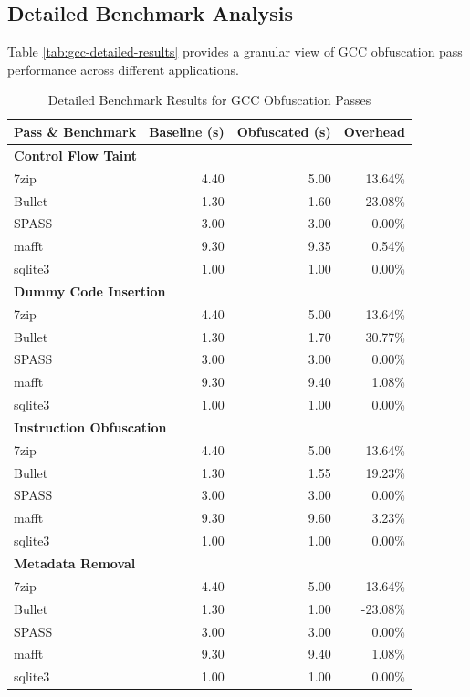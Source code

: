 \documentclass[conference]{IEEEtran}
\begin{document}
\subsection{Detailed Benchmark Analysis}

Table \ref{tab:gcc-detailed-results} provides a granular view of GCC obfuscation pass performance across different applications.

\begin{table}[ht!]
\centering
\footnotesize
\caption{Detailed Benchmark Results for GCC Obfuscation Passes}
\begin{tabular}{|l|r|r|r|}
\hline
\textbf{Pass \& Benchmark} & \textbf{Baseline (s)} & \textbf{Obfuscated (s)} & \textbf{Overhead} \\
\hline
\multicolumn{4}{|l|}{\textbf{Control Flow Taint}} \\
\hline
7zip & 4.40 & 5.00 & 13.64\% \\
Bullet & 1.30 & 1.60 & 23.08\% \\
SPASS & 3.00 & 3.00 & 0.00\% \\
mafft & 9.30 & 9.35 & 0.54\% \\
sqlite3 & 1.00 & 1.00 & 0.00\% \\
\hline
\multicolumn{4}{|l|}{\textbf{Dummy Code Insertion}} \\
\hline
7zip & 4.40 & 5.00 & 13.64\% \\
Bullet & 1.30 & 1.70 & 30.77\% \\
SPASS & 3.00 & 3.00 & 0.00\% \\
mafft & 9.30 & 9.40 & 1.08\% \\
sqlite3 & 1.00 & 1.00 & 0.00\% \\
\hline
\multicolumn{4}{|l|}{\textbf{Instruction Obfuscation}} \\
\hline
7zip & 4.40 & 5.00 & 13.64\% \\
Bullet & 1.30 & 1.55 & 19.23\% \\
SPASS & 3.00 & 3.00 & 0.00\% \\
mafft & 9.30 & 9.60 & 3.23\% \\
sqlite3 & 1.00 & 1.00 & 0.00\% \\
\hline
\multicolumn{4}{|l|}{\textbf{Metadata Removal}} \\
\hline
7zip & 4.40 & 5.00 & 13.64\% \\
Bullet & 1.30 & 1.00 & -23.08\% \\
SPASS & 3.00 & 3.00 & 0.00\% \\
mafft & 9.30 & 9.40 & 1.08\% \\
sqlite3 & 1.00 & 1.00 & 0.00\% \\

\end{tabular}
\end{table}
\end{document}
